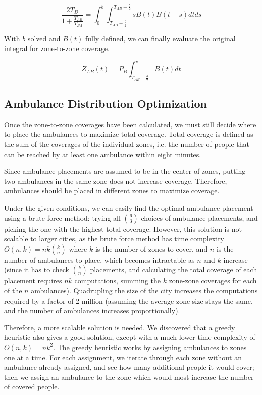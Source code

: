 \documentclass[notitlepage, 12pt]{article}
\begin{document}
$$\frac {2T_B}{1+ \frac{T_{AB}}{T_{BA}}} = \int^b_0 \int^{T_{AB} + \frac{b}{2}}_{T_{AB} - \frac{b}{2}} s B(t) B(t-s) dt ds$$

With $b$ solved and $B(t)$ fully defined, we can finally evaluate the original integral for zone-to-zone coverage.

$$Z_{AB}(t) = P_B \int^v_{T_{AB} - \frac{b}{2}} B(t) dt$$

\subsection{Ambulance Distribution Optimization}
Once the zone-to-zone coverages have been calculated, we must still decide where to place
the ambulances to maximize total coverage. Total coverage is defined as the sum of the coverages
of the individual zones, i.e. the number of people that can be reached by at least one ambulance
within eight minutes.

Since ambulance placements are assumed to be in the center of zones, putting two ambulances in the same
zone does not increase coverage. Therefore, ambulances should be placed in different zones to maximize
coverage.

Under the given conditions, we can easily find the optimal ambulance placement using a brute force
method: trying all $\binom{6}{3}$ choices of ambulance placements, and picking the one with the highest total coverage.
However, this solution is not scalable to larger cities, as the brute force method has time complexity
$O(n, k) = nk\binom{k}{n}$ where $k$ is the number of zones to cover, and $n$ is the number of ambulances to place, which
becomes intractable as $n$ and $k$ increase (since it has to check $\binom{k}{n}$ placements,
and calculating the total coverage of each placement requires $nk$ computations, summing the $k$ zone-zone
coverages for each of the $n$ ambulances). Quadrupling the size of the city
increases the computations required by a factor of 2 million (assuming the average zone size stays the same,
and the number of ambulances increases proportionally).

Therefore, a more scalable solution is needed. We discovered that a greedy heuristic also gives a good solution,
except with a much lower time complexity of $O(n, k) = n k^2$. The greedy heuristic works by assigning ambulances to zones
one at a time. For each assignment, we iterate through each zone without an ambulance already assigned, and see how many
additional people it would cover; then we assign an ambulance to the zone which would most increase the number of
covered people.
\end{document}
